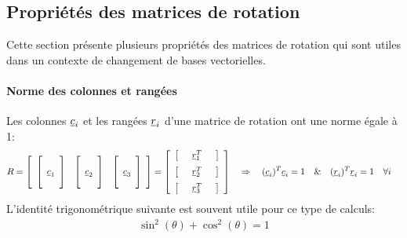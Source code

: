\subsection{Propriétés des matrices de rotation}

Cette section présente plusieurs propriétés des matrices de rotation qui sont utiles dans un contexte de changement de bases vectorielles.

\paragraph{Norme des colonnes et rangées}

Les colonnes $\underline{c}_i$ et les rangées $\underline{r}_i$ d'une matrice de rotation ont une norme égale à 1:
\begin{align}
	R &=
	\left[ \begin{array}{c c c}
			   \left[ \begin{array}{c} \\ \underline{c}_1 \\  \\ \end{array}  \right] & \left[ \begin{array}{c} \\ \underline{c}_2 \\  \\ \end{array}  \right] & \left[ \begin{array}{c} \\ \underline{c}_3 \\  \\ \end{array}  \right]
	\end{array} \right]
	=
	\left[ \begin{array}{c}
			   \left[ \begin{array}{c c c} & \underline{r}_1^T & \end{array} \right] \\[\medskipamount]
			   \left[ \begin{array}{c c c} & \underline{r}_2^T & \end{array} \right] \\[\medskipamount]
			   \left[ \begin{array}{c c c} & \underline{r}_3^T & \end{array} \right]
	\end{array} \right]
	\quad \Rightarrow \quad
	(\underline{c}_i)^T \underline{c}_i = 1 \quad \& \quad (\underline{r}_i)^T \underline{r}_i = 1  \quad \forall i
\end{align}
L’identité trigonométrique suivante est souvent utile pour ce type de calculs:
\begin{align}
	\sin^2(\theta) + \cos^2(\theta) = 1
\end{align}


